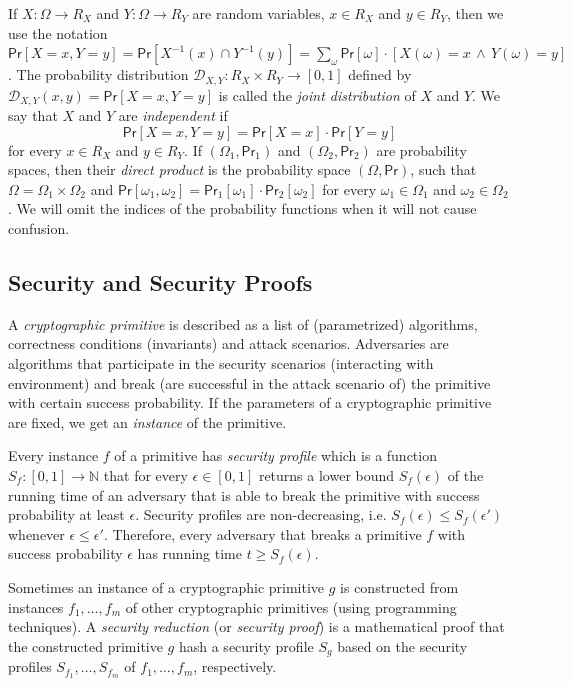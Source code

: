 \documentclass{article}
\newcommand{\prob}[0]{\mathsf{Pr}} %
\begin{document}
If $X\colon \Omega\rightarrow R_X$ and $Y\colon \Omega\rightarrow R_Y$ are
random variables, $x\in R_X$ and $y\in R_Y$, then we use the notation
$\prob[X=x, Y=y] = \prob[X^{-1}(x)\cap Y^{-1}(y)]=\sum_\omega \prob[\omega]\cdot[X(\omega)=x\,\wedge\, Y(\omega)=y]$.
The probability distribution $\mathcal{D}_{X,Y}\colon R_X \times R_Y\rightarrow [0,1]$ defined by $\mathcal{D}_{X,Y}(x,y)= \prob[X=x, Y=y]$ is called the \emph{joint distribution} of $X$ and $Y$.
We say that $X$ and $Y$ are \emph{independent} if
\[
\prob[X=x,Y=y]=\prob[X=x]\cdot\prob[Y=y]
\]
for every $x\in R_X$ and $y\in R_Y$.
If $(\Omega_1,\prob_1)$ and $(\Omega_2,\prob_2)$ are probability spaces, then their \emph{direct product} is the probability space $(\Omega, \prob)$, such that $\Omega = \Omega_1 \times \Omega_2$ and $\prob[\omega_1,\omega_2]=\prob_1[\omega_1]\cdot \prob_2[\omega_2]$ for every $\omega_1\in\Omega_1$ and $\omega_2\in\Omega_2$. We will omit the indices of the probability functions when it will not cause confusion.

\subsection{Security and Security Proofs}

A \emph{cryptographic primitive} is described as a list of (parametrized) algorithms, correctness conditions (invariants) and attack scenarios. Adversaries are algorithms that participate in the security scenarios (interacting with environment) and break (are successful in the attack scenario of) the primitive with certain success probability. If the parameters of a cryptographic primitive are fixed, we get an \emph{instance} of the primitive.

Every instance $f$ of a primitive has \emph{security profile}
which is a function $S_f\colon [0,1]\rightarrow \mathbb{N}$ that for every $\epsilon\in [0,1]$ returns a lower bound $S_f(\epsilon)$ of the running time of an adversary that is able to break the primitive with success probability at least $\epsilon$. Security profiles are non-decreasing, i.e.
$S_f(\epsilon)\le S_f(\epsilon')$ whenever $\epsilon\le \epsilon'$.
Therefore, every adversary that breaks a primitive $f$ with success probability $\epsilon$ has running time $t\ge S_f(\epsilon)$.

Sometimes an instance of a cryptographic primitive $g$ is constructed from instances $f_1, \ldots, f_m$ of other cryptographic primitives (using programming techniques).
A \emph{security reduction} (or \emph{security proof}) is a mathematical proof that the constructed primitive $g$ hash a security profile $S_g$
based on the security profiles $S_{f_1}, \ldots, S_{f_m}$ of $f_1, \ldots, f_m$, respectively.
\end{document}
